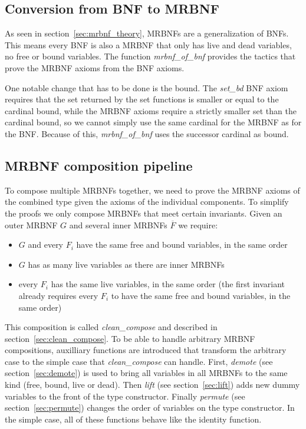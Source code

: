 \subsection{Conversion from BNF to MRBNF}\label{sec:conversion}

As seen in section~\ref{sec:mrbnf_theory}, \acp{MRBNF} are a generalization of \acp{BNF}. This means every \ac{BNF} is also a \ac{MRBNF} that only has live and dead variables, no free or bound variables. The function \textit{mrbnf\_of\_bnf} provides the tactics that prove the \ac{MRBNF} axioms from the \ac{BNF} axioms.

One notable change that has to be done is the bound. The \textit{set\_bd} \ac{BNF} axiom requires that the set returned by the set functions is smaller or equal to the cardinal bound, while the \ac{MRBNF} axioms require a strictly smaller set than the cardinal bound, so we cannot simply use the same cardinal for the \ac{MRBNF} as for the \ac{BNF}. Because of this, \textit{mrbnf\_of\_bnf} uses the successor cardinal as bound.

\subsection{\ac{MRBNF} composition pipeline}\label{sec:composition}

To compose multiple \acp{MRBNF} together, we need to prove the \ac{MRBNF} axioms of the combined type given the axioms of the individual components. To simplify the proofs we only compose \acp{MRBNF} that meet certain invariants. Given an outer \ac{MRBNF} $G$ and several inner \acp{MRBNF} $\overline{F}$ we require:

\begin{itemize}
\item{$G$ and every $F_i$ have the same free and bound variables, in the same order}
\item{$G$ has as many live variables as there are inner \acp{MRBNF}}
\item{every $F_i$ has the same live variables, in the same order (the first invariant already requires every $F_i$ to have the same free and bound variables, in the same order)}
\end{itemize}

This composition is called \textit{clean\_compose} and described in section~\ref{sec:clean_compose}. To be able to handle arbitrary \ac{MRBNF} compositions, auxilliary functions are introduced that transform the arbitrary case to the simple case that \textit{clean\_compose} can handle. First, \textit{demote} (see section~\ref{sec:demote}) is used to bring all variables in all \acp{MRBNF} to the same kind (free, bound, live or dead). Then \textit{lift} (see section~\ref{sec:lift}) adds new dummy variables to the front of the type constructor. Finally \textit{permute} (see section~\ref{sec:permute}) changes the order of variables on the type constructor. In the simple case, all of these functions behave like the identity function.

